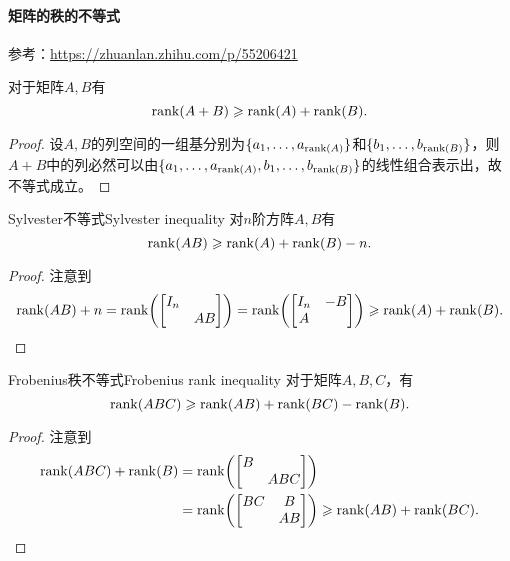 \paragraph{矩阵的秩的不等式}参考：\url{https://zhuanlan.zhihu.com/p/55206421}
\begin{theorem}{}{}
	对于矩阵$A,B$有
	\begin{equation}
		\operatorname{rank}(A+B)\geqslant\operatorname{rank}(A)+\operatorname{rank}(B).
	\end{equation}
\end{theorem}
\begin{proof}
	设$A,B$的列空间的一组基分别为$\{a_1,\ldots,a_{\operatorname{rank}(A)}\}$和$\{b_1,\ldots,b_{\operatorname{rank}(B)}\}$，则$A+B$中的列必然可以由$\{a_1,\ldots,a_{\operatorname{rank}(A)},b_1,\ldots,b_{\operatorname{rank}(B)}\}$的线性组合表示出，故不等式成立。
\end{proof}
\begin{theorem}{Sylvester不等式}{Sylvester inequality}
	对$n$阶方阵$A,B$有
	\begin{equation}
		\operatorname{rank}(AB)\geqslant\operatorname{rank}(A)+\operatorname{rank}(B)-n.
	\end{equation}
\end{theorem}
\begin{proof}
	注意到
	\[
		\operatorname{rank}(AB)+n=\operatorname{rank}\biggl(\begin{bmatrix}
			I_n\\ &AB
		\end{bmatrix}\biggr)=\operatorname{rank}\biggl(\begin{bmatrix}
			I_n&-B\\A
		\end{bmatrix}\biggr)\geqslant\operatorname{rank}(A)+\operatorname{rank}(B).\qedhere
	\]
\end{proof}

\begin{theorem}{Frobenius秩不等式}{Frobenius rank inequality}
	对于矩阵$A,B,C$，有
	\begin{equation}
		\operatorname{rank}(ABC)\geqslant\operatorname{rank}(AB)+\operatorname{rank}(BC)-\operatorname{rank}(B).
	\end{equation}
\end{theorem}
\begin{proof}
	注意到
	\begin{align*}
		\operatorname{rank}(ABC)+\operatorname{rank}(B)&=\operatorname{rank}\biggl(\begin{bmatrix}
			B\\ &ABC
		\end{bmatrix}\biggr)\\
		&=\operatorname{rank}\biggl(\begin{bmatrix}
			BC&B\\ &AB
		\end{bmatrix}\biggr)\geqslant\operatorname{rank}(AB)+\operatorname{rank}(BC).\qedhere
	\end{align*}
\end{proof}

